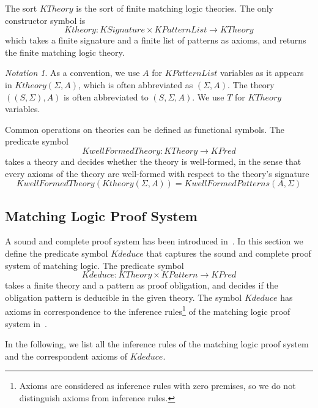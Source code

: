 \documentclass[UTF8,11pt]{article}
\newcounter{thmcounter}
\theoremstyle{plain}
\theoremstyle{definition}
\theoremstyle{remark}
\newtheorem{notation}   [thmcounter]{Notation}
\newcommand{\KPred}{\mathit{KPred}}
\newcommand{\KPatternList}{\mathit{KPatternList}}
\newcommand{\KPattern}{\mathit{KPattern}}
\newcommand{\KSignature}{\mathit{KSignature}}
\newcommand{\KwellFormedPatterns}{\mathit{KwellFormedPatterns}}
\newcommand{\KTheory}{\mathit{KTheory}}
\newcommand{\Ktheory}{\mathit{Ktheory}}
\newcommand{\KwellFormedTheory}{\mathit{KwellFormedTheory}}
\newcommand{\Kdeduce}{\mathit{Kdeduce}}
\begin{document}
The sort $\KTheory$ is the sort of finite matching logic theories. The only constructor symbol is 
$$\Ktheory \colon \KSignature \times \KPatternList \to \KTheory$$
which takes a finite signature and a finite list of patterns as axioms, and returns the finite matching logic theory. 

\begin{notation}
	As a convention, we use $A$ for $\KPatternList$ variables as it appears in $\Ktheory(\Sigma, A)$, which is often abbreviated as $( \Sigma, A )$. The theory $( ( S, \Sigma ), A )$ is often abbreviated to $( S, \Sigma, A )$. We use $T$ for $\KTheory$ variables.  
\end{notation}

Common operations on theories can be defined as functional symbols.
The predicate symbol
\begin{equation*}
  \KwellFormedTheory \colon \KTheory \to \KPred
\end{equation*}
takes a theory and decides whether the theory is well-formed, in the sense that every axioms of the theory are well-formed with respect to the theory's signature
\begin{equation*}
\KwellFormedTheory(\Ktheory(\Sigma, A)) = \KwellFormedPatterns(A, \Sigma)
\end{equation*}

\subsection{Matching Logic Proof System}
\label{sec:ml-proof-system-finite-case}

A sound and complete proof system has been introduced in~\cite{rosu-2017-lmcs}.
In this section we define the predicate symbol $\Kdeduce$ that captures the sound and complete proof system of matching logic.
The predicate symbol
$$
\Kdeduce \colon \KTheory \times \KPattern \to \KPred
$$
takes a finite theory and a pattern as proof obligation, and decides if the obligation pattern is deducible in the given theory.
The symbol $\Kdeduce$ has axioms in correspondence to the inference rules\footnote{Axioms are considered as inference rules with zero premises, so we do not distinguish axioms from inference rules.} 
of the matching logic proof system in~\cite{rosu-2017-lmcs}.

In the following, we list all the inference rules of the matching logic proof system and the correspondent axioms of $\Kdeduce$. 
\end{document}
